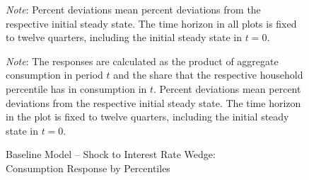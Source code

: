\documentclass[a4paper,12pt]{article} %
\numberwithin{equation}{section} %
\numberwithin{figure}{section}
\numberwithin{table}{section}
\begin{document}
\begin{refsection}
\begin{appendices}
\begin{figure}[H]
     \vspace{10pt}

     \begin{flushleft}
     \footnotesize
	\textit{Note}: Percent deviations mean percent deviations from the respective initial steady state. The time horizon in all plots is fixed to twelve quarters, including the initial steady state in $t=0$.
	\end{flushleft}
\end{figure}

\begin{figure}[H]
    \centering
    \caption{Baseline Model -- Shock to Interest Rate Wedge: \\ Consumption Response by Percentiles}
    \label{fig:baseline-permanent-wedge-dist-c-response}
    
    
    \vspace{10pt}
    
    \begin{minipage}{0.75\textwidth} 
    \footnotesize
    \textit{Note}: The responses are calculated as the product of aggregate consumption in period $t$ and the share that the respective household percentile has in consumption in $t$. Percent deviations mean percent deviations from the respective initial steady state. The time horizon in the plot is fixed to twelve quarters, including the initial steady state in $t=0$.
    \end{minipage}
\end{figure}



\end{appendices}
\end{refsection}
\end{document}
